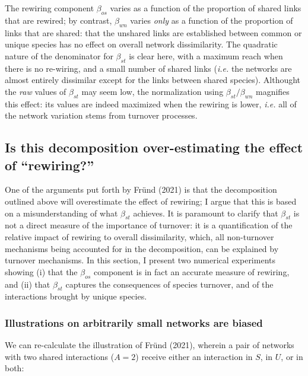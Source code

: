 \documentclass[10pt,oneside]{article}
\begin{document}
The rewiring component \(\beta_{os}\) varies as a function of the
proportion of shared links that are rewired; by contrast, \(\beta_{wn}\)
varies \emph{only} as a function of the proportion of links that are
shared: that the unshared links are established between common or unique
species has no effect on overall network dissimilarity. The quadratic
nature of the denominator for \(\beta_{st}\) is clear here, with a
maximum reach when there is no re-wiring, and a small number of shared
links (\emph{i.e.} the networks are almost entirely dissimilar except
for the links between shared species). Althought the \emph{raw} values
of \(\beta_{st}\) may seem low, the normalization using
\(\beta_{st}/\beta_{wn}\) magnifies this effect: its values are indeed
maximized when the rewiring is lower, \emph{i.e.} all of the network
variation stems from turnover processes.

\hypertarget{is-this-decomposition-over-estimating-the-effect-of-rewiring}{%
\subsection{Is this decomposition over-estimating the effect of
``rewiring?''}\label{is-this-decomposition-over-estimating-the-effect-of-rewiring}}

One of the arguments put forth by Fründ (2021) is that the decomposition
outlined above will overestimate the effect of rewiring; I argue that
this is based on a misunderstanding of what \(\beta_{st}\) achieves. It
is paramount to clarify that \(\beta_{st}\) is not a direct measure of
the importance of turnover: it is a quantification of the relative
impact of rewiring to overall dissimilarity, which, all non-turnover
mechanisms being accounted for in the decomposition, can be explained by
turnover mechanisms. In this section, I present two numerical
experiments showing (i) that the \(\beta_{os}\) component is in fact an
accurate measure of rewiring, and (ii) that \(\beta_{st}\) captures the
consequences of species turnover, and of the interactions brought by
unique species.

\hypertarget{illustrations-on-arbitrarily-small-networks-are-biased}{%
\subsubsection{Illustrations on arbitrarily small networks are
biased}\label{illustrations-on-arbitrarily-small-networks-are-biased}}

We can re-calculate the illustration of Fründ (2021), wherein a pair of
networks with two shared interactions (\(A = 2\)) receive either an
interaction in \(S\), in \(U\), or in both:
\end{document}

